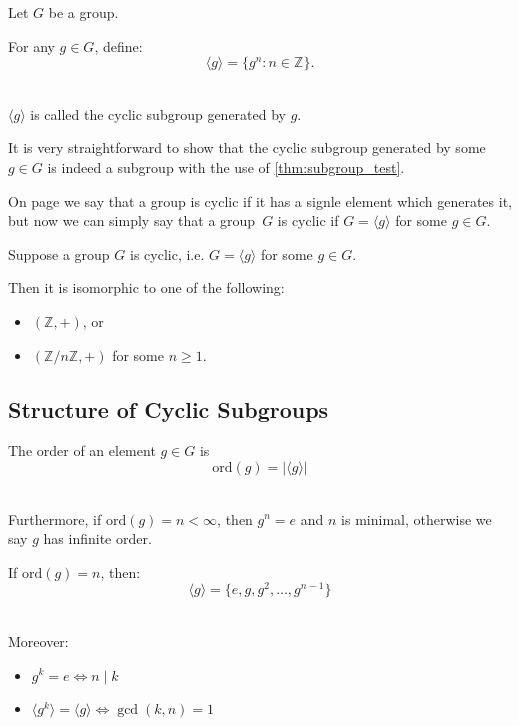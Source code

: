 \begin{defn}
    Let $G$ be a group. 

    For any $g \in G$, define: 
    $$ 
        \langle g \rangle  = \{g^n : n \in \mathbb Z\}.
    $$ 

    $\langle g \rangle$ is called the cyclic subgroup generated 
    by $g$. 
\end{defn}

It is very straightforward to show that the cyclic subgroup generated 
by some $g \in G$ is indeed a subgroup with the use of 
\cref{thm:subgroup_test}.

On page \pageref{defn:roots_of_unity} we say that a group is cyclic 
if it has a signle element which generates it, but now we can simply
say that a group $G$ is cyclic if $G = \langle g \rangle$ for some 
$g \in G$.

\begin{thm}
    Suppose a group $G$ is cyclic, i.e. $G = \langle g \rangle$ 
    for some $g \in G$. 

    Then it is isomorphic to one of the following: 
    \begin{itemize}
        \item $(\mathbb Z, +)$, or 
        \item $(\mathbb Z/n\mathbb Z, +)$ for some $n \geq 1$. 
    \end{itemize}
\end{thm}

\subsection{Structure of Cyclic Subgroups}
\begin{defn}[Order]
    The order of an element $g \in G$ is 
    $$ 
        \text{ord}(g) = |\langle g \rangle|
    $$ 
\end{defn}

Furthermore, if $\text{ord}(g) = n < \infty$, then $g^n = e$ and 
$n$ is minimal, otherwise we say $g$ has infinite order.  

If $\text{ord}(g) = n$, then: 
$$ 
    \langle g \rangle = \{e, g, g^2, \ldots, g^{n-1}\}
$$ 

Moreover: 
\begin{itemize}
    \item $g^k = e \Leftrightarrow n \mid k$
    \item $\langle g^k \rangle = \langle g \rangle \Leftrightarrow 
        \gcd(k,n) = 1$
\end{itemize}

